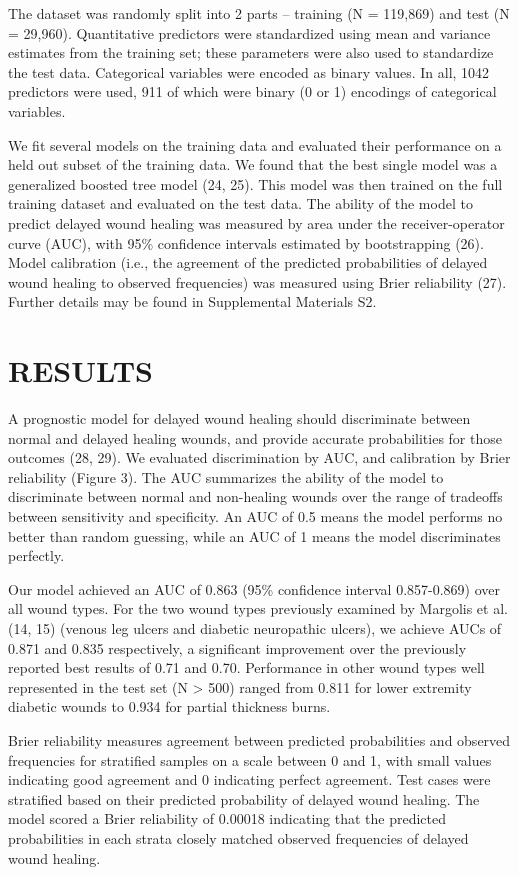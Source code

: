 The dataset was randomly split into 2 parts – training (N = 119,869)
and test (N = 29,960).  Quantitative predictors were standardized
using mean and variance estimates from the training set; these
parameters were also used to standardize the test data.  Categorical
variables were encoded as binary values.  In all, 1042 predictors were
used, 911 of which were binary (0 or 1) encodings of categorical
variables.

We fit several models on the training data and evaluated their
performance on a held out subset of the training data.  We found that
the best single model was a generalized boosted tree model (24, 25).
This model was then trained on the full training dataset and evaluated
on the test data.  The ability of the model to predict delayed wound
healing was measured by area under the receiver-operator curve (AUC),
with 95\% confidence intervals estimated by bootstrapping (26).  Model
calibration (i.e., the agreement of the predicted probabilities of
delayed wound healing to observed frequencies) was measured using
Brier reliability (27).  Further details may be found in Supplemental
Materials S2.

\section{RESULTS}

A prognostic model for delayed wound healing should discriminate
between normal and delayed healing wounds, and provide accurate
probabilities for those outcomes (28, 29).  We evaluated
discrimination by AUC, and calibration by Brier reliability (Figure
3).  The AUC summarizes the ability of the model to discriminate
between normal and non-healing wounds over the range of tradeoffs
between sensitivity and specificity.  An AUC of 0.5 means the model
performs no better than random guessing, while an AUC of 1 means the
model discriminates perfectly.

Our model achieved an AUC of 0.863 (95\% confidence interval
0.857-0.869) over all wound types.  For the two wound types previously
examined by Margolis et al. (14, 15) (venous leg ulcers and diabetic
neuropathic ulcers), we achieve AUCs of 0.871 and 0.835 respectively,
a significant improvement over the previously reported best results of
0.71 and 0.70.  Performance in other wound types well represented in
the test set (N > 500) ranged from 0.811 for lower extremity diabetic
wounds to 0.934 for partial thickness burns.

Brier reliability measures agreement between predicted probabilities
and observed frequencies for stratified samples on a scale between 0
and 1, with small values indicating good agreement and 0 indicating
perfect agreement.  Test cases were stratified based on their
predicted probability of delayed wound healing.  The model scored a
Brier reliability of 0.00018 indicating that the predicted
probabilities in each strata closely matched observed frequencies of
delayed wound healing.

